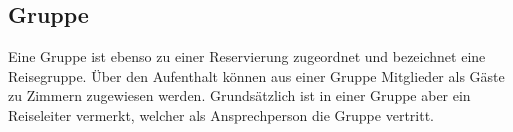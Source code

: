 \documentclass[../../Pflichtenheft.tex]{subfiles}
\begin{document}
    \subsection{Gruppe}
    Eine Gruppe ist ebenso zu einer Reservierung zugeordnet und bezeichnet eine Reisegruppe.
    Über den Aufenthalt können aus einer Gruppe Mitglieder als Gäste zu Zimmern zugewiesen werden. Grundsätzlich ist in einer
    Gruppe aber ein Reiseleiter vermerkt, welcher als Ansprechperson die Gruppe vertritt.
\end{document}
